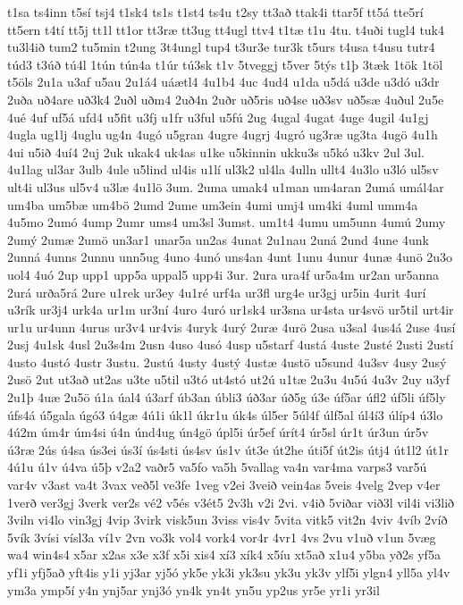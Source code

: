 {t1sa
ts4inn
t5sí
tsj4
t1sk4
ts1s
t1st4
ts4u
t2sy
tt3að
ttak4i
ttar5f
tt5á
tte5rí
tt5ern
t4tí
tt5j
tt1l
tt1or
tt3ræ
tt3ug
tt4ugl
ttv4
t1tæ
t1u
4tu.
t4uði
tugl4
tuk4
tu3l4ið
tum2
tu5min
t2ung
3t4ungl
tup4
t3ur3e
tur3k
t5urs
t4usa
t4usu
tutr4
túd3
t3úð
tú4l
1tún
tún4a
t1úr
tú3sk
t1v
5tveggj
t5ver
5týs
t1þ
3tæk
1tök
1töl
t5öls
2u1a
u3af
u5au
2u1á4
uáætl4
4u1b4
4uc
4ud4
u1da
u5dá
u3de
u3dó
u3dr
2uða
uð4are
uð3k4
2uðl
uðm4
2uð4n
2uðr
uð5ris
uð4se
uð3sv
uð5sæ
4uðul
2u5e
4ué
4uf
uf5á
ufd4
u5fit
u3fj
u1fr
u3ful
u5fú
2ug
4ugal
4ugat
4uge
4ugil
4u1gj
4ugla
ug1lj
4uglu
ug4n
4ugó
u5gran
4ugre
4ugrj
4ugró
ug3ræ
ug3ta
4ugö
4u1h
4ui
u5ið
4uí4
2uj
2uk
ukak4
uk4as
u1ke
u5kinnin
ukku3s
u5kó
u3kv
2ul
3ul.
4u1lag
ul3ar
3ulb
4ule
u5lind
ul4is
u1lí
ul3k2
ul4la
4ulln
ullt4
4u3lo
u3ló
ul5sv
ult4i
ul3us
ul5v4
u3læ
4u1lö
3um.
2uma
umak4
u1man
um4aran
2umá
umál4ar
um4ba
um5bæ
um4bö
2umd
2ume
um3ein
4umi
umj4
um4ki
4uml
umm4a
4u5mo
2umó
4ump
2umr
ums4
um3sl
3umst.
um1t4
4umu
um5unn
4umú
2umy
2umý
2umæ
2umö
un3ar1
unar5a
un2as
4unat
2u1nau
2uná
2und
4une
4unk
2unná
4unns
2unnu
unn5ug
4uno
4unó
uns4an
4unt
1unu
4unur
4unæ
4unö
2u3o
uol4
4uó
2up
upp1
upp5a
uppal5
upp4i
3ur.
2ura
ura4f
ur5a4m
ur2an
ur5anna
2urá
urða5rá
2ure
u1rek
ur3ey
4u1ré
urf4a
ur3fl
urg4e
ur3gj
ur5in
4urit
4urí
u3rík
ur3j4
urk4a
ur1m
ur3ní
4uro
4uró
ur1sk4
ur3sna
ur4sta
ur4svö
ur5til
urt4ir
ur1u
ur4unn
4urus
ur3v4
ur4vis
4uryk
4urý
2uræ
4urö
2usa
u3sal
4us4á
2use
4usí
2usj
4u1sk
4usl
2u3s4m
2usn
4uso
4usó
4usp
u5starf
4ustá
4uste
2usté
2usti
2ustí
4usto
4ustó
4ustr
3ustu.
2ustú
4usty
4ustý
4ustæ
4ustö
u5sund
4u3sv
4usy
2usý
2usö
2ut
ut3að
ut2as
u3te
u5til
u3tó
ut4stó
ut2ú
u1tæ
2u3u
4u5ú
4u3v
2uy
u3yf
2u1þ
4uæ
2u5ö
ú1a
úal4
ú3arf
úb3an
úbli3
úð3ar
úð5g
ú3e
úf5ar
úfl2
úf5li
úf5ly
úfs4á
ú5gala
úgó3
ú4gæ
4ú1i
úk1l
úkr1u
úk4s
úl5er
5úl4f
úlf5al
úl4í3
úlíp4
ú3lo
4ú2m
úm4r
úm4si
ú4n
únd4ug
ún4gö
úpl5i
úr5ef
úrít4
úr5sl
úr1t
úr3un
úr5v
ú3ræ
2ús
ú4sa
ús3ei
ús3í
ús4sti
ús4sv
ús1v
út3e
út2he
úti5f
út2is
útj4
út1l2
út1r
4ú1u
ú1v
ú4va
ú5þ
v2a2
vaðr5
va5fo
va5h
5vallag
va4n
var4ma
varps3
var5ú
var4v
v3ast
va4t
3vax
veð5l
ve3fe
1veg
v2ei
3veið
vein4as
5veis
4velg
2vep
v4er
1verð
ver3gj
3verk
ver2s
vé2
v5és
v3ét5
2v3h
v2i
2vi.
v4ið
5viðar
við3l
vil4i
vi3lið
3viln
vi4lo
vin3gj
4vip
3virk
visk5un
3viss
vis4v
5vita
vitk5
vit2n
4viv
4víb
2víð
5vík
3vísi
vísl3a
ví1v
2vn
vo3k
vol4
vork4
vor4r
4vr1
4vs
2vu
v1uð
v1un
5væg
wa4
win4s4
x5ar
x2as
x3e
x3f
x5i
xis4
xí3
xík4
x5íu
xt5að
x1u4
y5ba
yð2s
yf5a
yf1i
yfj5að
yft4is
y1i
yj3ar
yj5ó
yk5e
yk3i
yk3su
yk3u
yk3v
ylf5i
ylgn4
yll5a
yl4v
ym3a
ymp5í
y4n
ynj5ar
ynj3ó
yn4k
yn4t
yn5u
yp2us
yr5e
yr1i
yr3il
}
